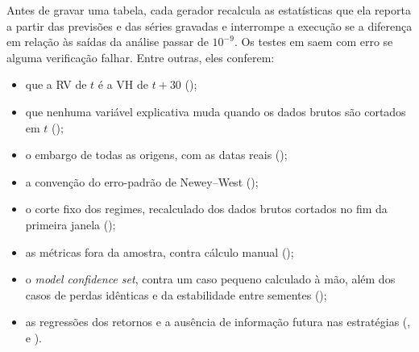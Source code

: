 Antes de gravar uma tabela, cada gerador  recalcula as
estatísticas que ela reporta a partir das previsões e das séries gravadas e
interrompe a execução se a diferença em relação às saídas da análise passar de
$10^{-9}$. Os testes em  saem com erro se alguma
verificação falhar. Entre outras, eles conferem:
\begin{itemize}
    \item que a RV de $t$ é a VH de $t+30$
          ();
    \item que nenhuma variável explicativa muda quando os dados brutos são
          cortados em $t$ ();
    \item o embargo de todas as origens, com as datas reais
          ();
    \item a convenção do erro-padrão de Newey--West
          ();
    \item o corte fixo dos regimes, recalculado dos dados brutos cortados no
          fim da primeira janela ();
    \item as métricas fora da amostra, contra cálculo manual
          ();
    \item o \textit{model confidence set}, contra um caso pequeno calculado à
          mão, além dos casos de perdas idênticas e da estabilidade entre
          sementes ();
    \item as regressões dos retornos e a ausência de informação futura nas
          estratégias (,  e
          ).
\end{itemize}
